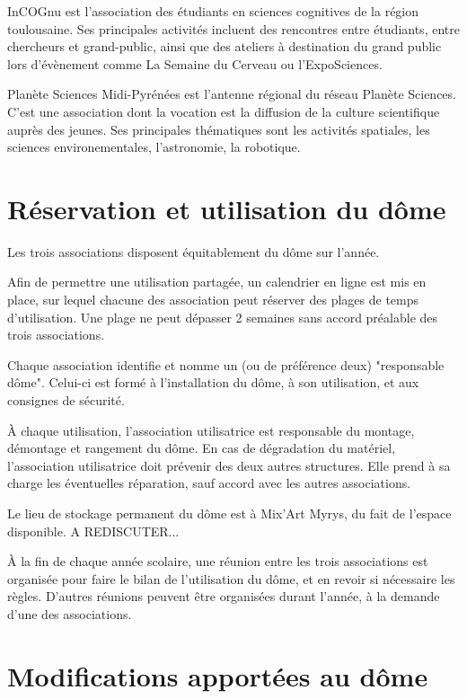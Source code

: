 \documentclass[a4paper,12pt]{article}
\begin{document}
InCOGnu est l'association des étudiants en sciences cognitives de la région
toulousaine. Ses principales activités incluent des rencontres entre étudiants,
entre chercheurs et grand-public, ainsi que des ateliers à destination du grand
public lors d'évènement comme La Semaine du Cerveau ou l'ExpoSciences.

Planète Sciences Midi-Pyrénées est l'antenne régional du réseau Planète
Sciences. C'est une association dont la vocation est la diffusion de la culture
scientifique auprès des jeunes. Ses principales thématiques sont les activités
spatiales, les sciences environementales, l'astronomie, la robotique.

\section{Réservation et utilisation du dôme}

Les trois associations disposent équitablement du dôme sur l'année.

Afin de permettre une utilisation partagée, un calendrier en ligne est mis en
place, sur lequel chacune des association peut réserver des plages de temps
d'utilisation. Une plage ne peut dépasser 2 semaines sans accord préalable des
trois associations.

Chaque association identifie et nomme un (ou de préférence deux) "responsable
dôme". Celui-ci est formé à l'installation du dôme, à son utilisation, et aux
consignes de sécurité.

À chaque utilisation, l'association utilisatrice est responsable du montage,
démontage et rangement du dôme. En cas de dégradation du matériel,
l'association utilisatrice doit prévenir des deux autres structures. Elle prend
à sa charge les éventuelles réparation, sauf accord avec les autres
associations.

Le lieu de stockage permanent du dôme est à Mix'Art Myrys, du fait de l'espace
disponible. A REDISCUTER...

À la fin de chaque année scolaire, une réunion entre les trois associations est
organisée pour faire le bilan de l'utilisation du dôme, et en revoir si
nécessaire les règles. D'autres réunions peuvent être organisées durant
l'année, à la demande d'une des associations.

\section{Modifications apportées au dôme}
\end{document}
